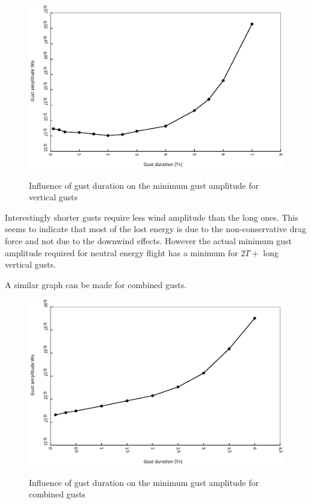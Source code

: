 \begin{figure}[ht]
	\begin{center}
		\scalebox{0.8}
		{\includegraphics{./Figures/vertical_gust_amplitude_vs_duration.eps}}
	\end{center}
	\caption{Influence of gust duration on the minimum gust amplitude for vertical gusts}
	\label{fig:vertical_amplitude_duration}
\end{figure}

\par Interestingly shorter gusts require less wind amplitude than the long ones.
This seems to indicate that most of the lost energy is due to the non-conservative drag force and not due to the downwind effects.
However the actual minimum gust amplitude required for neutral energy flight has a minimum for $2T+$ long vertical gusts.

\par A similar graph can be made for combined gusts.

\begin{figure}[ht]
	\begin{center}
		\scalebox{0.8}
		{\includegraphics{./Figures/combined_gust_amplitude_vs_duration.eps}}
	\end{center}
	\caption{Influence of gust duration on the minimum gust amplitude for combined gusts}
	\label{fig:combined_amplitude_duration}
\end{figure}

